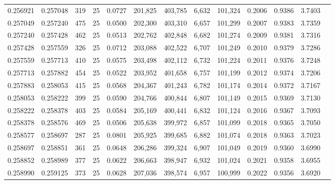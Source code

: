 \begin{tabular}{rrrrrrrrrrrrr}
0.256921 & 0.257048 &   319 &  25 &                                     0.0727 & 201,825 & 403,785 &   6,632 & 101,324 & 0.2006 & 0.9386 & 3.7403 \\
0.257049 & 0.257240 &   475 &  25 &                                     0.0500 & 202,300 & 403,310 &   6,657 & 101,299 & 0.2007 & 0.9383 & 3.7359 \\
0.257240 & 0.257428 &   462 &  25 &                                     0.0513 & 202,762 & 402,848 &   6,682 & 101,274 & 0.2009 & 0.9381 & 3.7316 \\
0.257428 & 0.257559 &   326 &  25 &                                     0.0712 & 203,088 & 402,522 &   6,707 & 101,249 & 0.2010 & 0.9379 & 3.7286 \\
0.257559 & 0.257713 &   410 &  25 &                                     0.0575 & 203,498 & 402,112 &   6,732 & 101,224 & 0.2011 & 0.9376 & 3.7248 \\
0.257713 & 0.257882 &   454 &  25 &                                     0.0522 & 203,952 & 401,658 &   6,757 & 101,199 & 0.2012 & 0.9374 & 3.7206 \\
0.257883 & 0.258053 &   415 &  25 &                                     0.0568 & 204,367 & 401,243 &   6,782 & 101,174 & 0.2014 & 0.9372 & 3.7167 \\
0.258053 & 0.258222 &   399 &  25 &                                     0.0590 & 204,766 & 400,844 &   6,807 & 101,149 & 0.2015 & 0.9369 & 3.7130 \\
0.258222 & 0.258378 &   403 &  25 &                                     0.0584 & 205,169 & 400,441 &   6,832 & 101,124 & 0.2016 & 0.9367 & 3.7093 \\
0.258378 & 0.258576 &   469 &  25 &                                     0.0506 & 205,638 & 399,972 &   6,857 & 101,099 & 0.2018 & 0.9365 & 3.7050 \\
0.258577 & 0.258697 &   287 &  25 &                                     0.0801 & 205,925 & 399,685 &   6,882 & 101,074 & 0.2018 & 0.9363 & 3.7023 \\
0.258697 & 0.258851 &   361 &  25 &                                     0.0648 & 206,286 & 399,324 &   6,907 & 101,049 & 0.2019 & 0.9360 & 3.6990 \\
0.258852 & 0.258989 &   377 &  25 &                                     0.0622 & 206,663 & 398,947 &   6,932 & 101,024 & 0.2021 & 0.9358 & 3.6955 \\
0.258990 & 0.259125 &   373 &  25 &                                     0.0628 & 207,036 & 398,574 &   6,957 & 100,999 & 0.2022 & 0.9356 & 3.6920 \\

\end{tabular}
